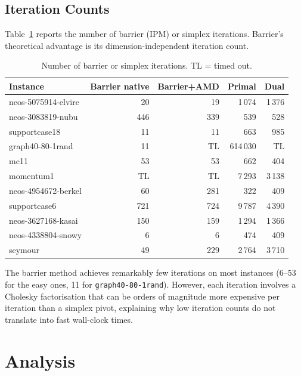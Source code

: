 \documentclass[11pt,a4paper]{article}
\begin{document}
\subsection{Iteration Counts}
\label{sec:iterations}

Table~\ref{tab:iters} reports the number of barrier (IPM) or simplex
iterations.  Barrier's theoretical advantage is its
dimension-independent iteration count.

\begin{table}[h]
\centering
\caption{Number of barrier or simplex iterations. TL = timed out.}
\label{tab:iters}
\setlength{\tabcolsep}{5pt}
\begin{tabular}{@{}lrrrr@{}}
\toprule
\textbf{Instance}
  & \textbf{Barrier native}
  & \textbf{Barrier+AMD}
  & \textbf{Primal}
  & \textbf{Dual} \\
\midrule
neos-5075914-elvire & 20  & 19  & 1\,074  & 1\,376 \\
neos-3083819-nubu   & 446 & 339 & 539     & 528 \\
supportcase18       & 11  & 11  & 663     & 985 \\
graph40-80-1rand    & 11  & TL  & 614\,030 & TL \\
mc11                & 53  & 53  & 662     & 404 \\
momentum1           & TL  & TL  & 7\,293  & 3\,138 \\
neos-4954672-berkel & 60  & 281 & 322     & 409 \\
supportcase6        & 721 & 724 & 9\,787  & 4\,390 \\
neos-3627168-kasai  & 150 & 159 & 1\,294  & 1\,366 \\
neos-4338804-snowy  & 6   & 6   & 474     & 409 \\
seymour             & 49  & 229 & 2\,764  & 3\,710 \\
\bottomrule
\end{tabular}
\end{table}

\noindent The barrier method achieves remarkably few iterations on most
instances (6--53 for the easy ones, 11 for \texttt{graph40-80-1rand}).
However, each iteration involves a Cholesky factorisation that can be orders
of magnitude more expensive per iteration than a simplex pivot, explaining
why low iteration counts do not translate into fast wall-clock times.

\section{Analysis}
\end{document}
